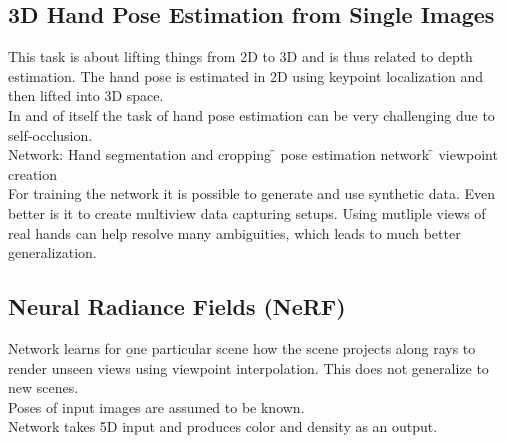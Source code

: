 \subsection{3D Hand Pose Estimation from Single Images}
This task is about lifting things from 2D to 3D and is thus related to depth estimation. The hand pose is estimated in 2D using keypoint localization and then lifted into 3D space.\\
In and of itself the task of hand pose estimation can be very challenging due to self-occlusion.\\

Network: Hand segmentation and cropping \f{\to} pose estimation network \f{\to} viewpoint creation \\

For training the network it is possible to generate and use synthetic data. Even better is it to create multiview data capturing setups. Using mutliple views of real hands can help resolve many ambiguities, which leads to much better generalization.

\subsection{Neural Radiance Fields (NeRF)}
Network learns for \b{one particular scene} how the scene projects along rays to render unseen views using viewpoint interpolation. This does not generalize to new scenes.\\
Poses of input images are assumed to be known.\\
Network takes 5D input and produces color and density as an output.



\newpage